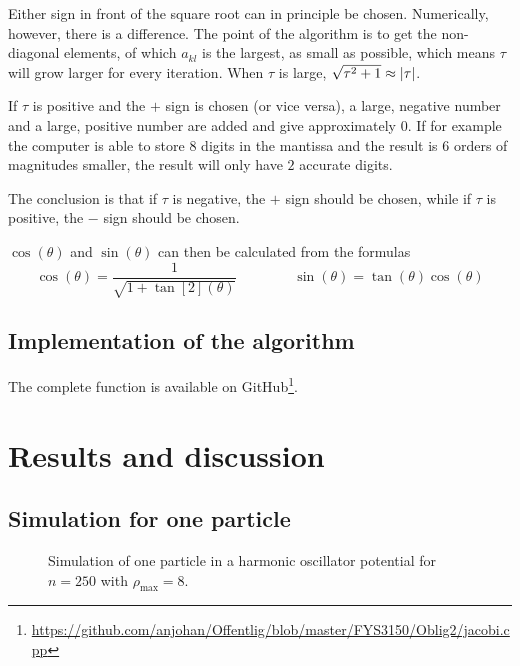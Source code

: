 \documentclass[12pt,english,a4paper]{report}
\begin{document}
Either sign in front of the square root can in principle be chosen. Numerically, however, there is a difference. The point of the algorithm is to get the non-diagonal elements, of which \(a_{kl}\) is the largest, as small as possible, which means \(\tau\) will grow larger for every iteration. When \(\tau\) is large, \(\sqrt{\tau^2+1}\approx\abs{\tau}\).

If \(\tau\) is positive and the \(+\) sign is chosen (or vice versa), a large, negative number and a large, positive number are added and give approximately \(0\). If for example the computer is able to store \(8\) digits in the mantissa and the result is \(6\) orders of magnitudes smaller, the result will only have \(2\) accurate digits.

The conclusion is that if \(\tau\) is negative, the \(+\) sign should be chosen, while if \(\tau\) is positive, the \(-\) sign should be chosen.

\(\cos(\theta)\) and \(\sin(\theta)\) can then be calculated from the formulas
\[
\cos(\theta)=\frac{1}{\sqrt{1+\tan[2](\theta)}}\qquad\qquad \sin(\theta)=\tan(\theta)\cos(\theta)
\]

\clearpage
\subsection{Implementation of the algorithm}
The complete function is available on GitHub\footnote{\url{https://github.com/anjohan/Offentlig/blob/master/FYS3150/Oblig2/jacobi.cpp}}.




%


\section{Results and discussion}
\subsection{Simulation for one particle}
\begin{figure}[H]
\centering

\caption{Simulation of one particle in a harmonic oscillator potential for \(n=250\) with \(\rho_{\max}=8\).}\label{fig:en}
\end{figure}
\end{document}
